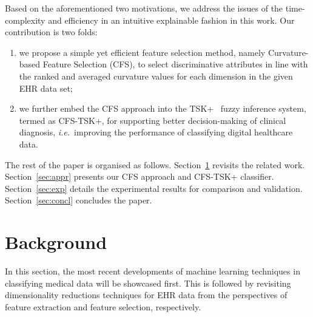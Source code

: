 \documentclass{article}
\newcommand{\zzie}{\emph{i.e.}~}
\newcommand*{\1}{\textcolor{red}}
\begin{document}
Based on the aforementioned two motivations, we address the issues of the time-complexity and efficiency in an intuitive explainable fashion in this work. Our contribution is two folds:



\begin{enumerate}
  \item we propose a simple yet efficient feature selection method, namely Curvature-based Feature Selection (CFS), to select discriminative attributes in line with the ranked and averaged curvature values for each dimension in the given EHR data set;
  
  \item we further embed the CFS approach into the TSK+~\cite{Jie2017} fuzzy inference system, termed as CFS-TSK+, for supporting better decision-making of clinical diagnosis, \zzie improving the performance of classifying digital healthcare data.
\end{enumerate}

The rest of the paper is organised as follows. Section~\ref{sec:bg} revisits the related work. Section~\ref{sec:appr} presents our CFS approach and CFS-TSK+ classifier. Section~\ref{sec:exp} details the experimental results for comparison and validation. Section~\ref{sec:concl} concludes the paper.

\section{Background}\label{sec:bg}


In this section, the most recent developments of machine learning techniques in classifying medical data will be showcased first. This is followed by revisiting dimensionality reductions techniques for EHR data from the perspectives of feature extraction and feature selection, respectively.
\end{document}
